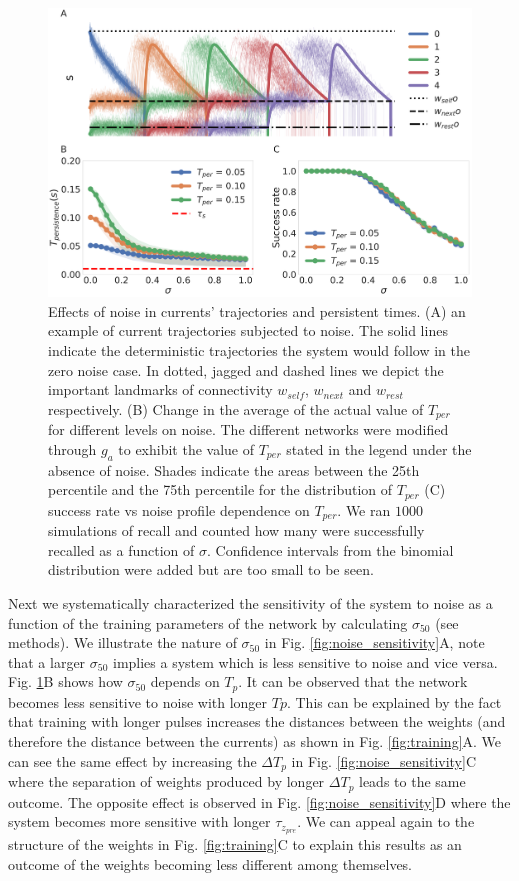 \documentclass[10pt,a4paper]{article}
\begin{document}
\begin{figure}[H]
\centering
\includegraphics[scale=0.17]{noise_diagram.pdf}
\caption{Effects of noise in currents' trajectories and persistent times. (A) an example of current trajectories subjected to noise. The solid lines indicate the deterministic trajectories the system would follow in the zero noise case. In dotted, jagged and dashed lines we depict the important landmarks of connectivity $w_{self}$, $w_{next}$ and $w_{rest}$ respectively. (B)  Change in the average of the actual value of $T_{per}$ for different levels on noise. The different networks were modified through $g_a$ to exhibit the value of $T_{per}$ stated in the legend under the absence of noise. Shades indicate the areas between the 25th percentile and the 75th percentile for the distribution of $T_{per}$ (C) success rate vs noise profile dependence on  $T_{per}$. We ran $1000$ simulations of recall and counted how many were successfully recalled as a function of $\sigma$. Confidence intervals from the binomial distribution were added but are too small to be seen.}
\label{fig:noise_scheme}
\end{figure}

Next we systematically characterized the sensitivity of the system to noise as a function of the training parameters of the network by calculating $\sigma_{50}$ (see methods). We illustrate the nature of $\sigma_{50}$ in Fig. \ref{fig:noise_sensitivity}A, note that a larger $\sigma_{50}$ implies a system which is less sensitive to noise and vice versa. Fig. \ref{fig:noise_scheme}B shows how $\sigma_{50}$ depends on $T_p$. It can be observed that the network becomes less sensitive to noise with longer $Tp$. This can be explained by the fact that training with longer pulses increases the distances between the weights (and therefore the distance between the currents) as shown in Fig. \ref{fig:training}A. We can see the same effect by increasing the $\Delta T_p$ in Fig. \ref{fig:noise_sensitivity}C where the separation of weights produced by longer $\Delta T_p$ leads to the same outcome. The opposite effect is observed in Fig. \ref{fig:noise_sensitivity}D where the system becomes more sensitive with longer $\tau_{z_{pre}}$. We can appeal again to the structure of the weights in Fig. \ref{fig:training}C to explain this results as an outcome of the weights becoming less different among themselves. 
\end{document}
